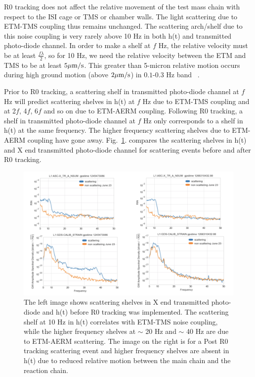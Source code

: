 \documentclass[12pt]{iopart}
\begin{document}
\par
R0 tracking does not affect the relative movement of the test mass chain with respect to the ISI cage or TMS or chamber walls. The light scattering due to ETM-TMS coupling thus remains unchanged. The scattering arch/shelf due to this noise coupling is very rarely above 10 Hz in both h(t) and transmitted photo-diode channel. In order to make a shelf at $f$ Hz, the relative velocity must be at least $\frac{f{\lambda}}{2}$, so for 10 Hz, we need the relative velocity between the ETM and TMS to be at least $5\mu{\rm m/s}$. This greater than 5-micron relative motion occurs during high ground motion (above $2\mu{\rm m/s}$) in $0.1$-$0.3$ Hz band ~\cite{alogsid_trans}.
\par
Prior to R0 tracking, a scattering shelf in transmitted photo-diode channel at $f$ Hz will predict scattering shelves in h(t) at $f$ Hz due to ETM-TMS coupling and at 2$f$, 4$f$, 6$f$ and so on due to ETM-AERM coupling. Following R0 tracking, a shelf in transmitted photo-diode channel at $f$ Hz only corresponds to a shelf in h(t) at the same frequency. The higher frequency scattering shelves due to ETM-AERM coupling have gone away. Fig.~\ref{fig:etm-transmon}.
compares the scattering shelves in h(t) and X end transmitted photo-diode channel for scattering events before and after R0 tracking.
\par
\begin{figure}[h]
    \centering
    \includegraphics[width=\textwidth]{etm-transmon1.png}
    \caption{The left image shows scattering shelves in X end transmitted photo-diode and h(t) before R0 tracking was implemented. The scattering shelf at 10 Hz in h(t) correlates with ETM-TMS noise coupling, while the higher frequency shelves at $\sim$ 20 Hz and $\sim$ 40 Hz are due to ETM-AERM scattering. The image on the right is for a Post R0 tracking scattering event and higher frequency shelves are absent in h(t) due to reduced relative motion between the main chain and the reaction chain.}
    \label{fig:etm-transmon}
\end{figure}
\end{document}
